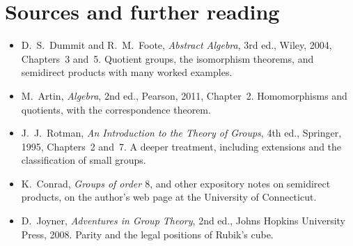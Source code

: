 \section*{Sources and further reading}

\begin{itemize}
\item D.~S.~Dummit and R.~M.~Foote, \emph{Abstract Algebra}, 3rd ed., Wiley, 2004, Chapters~3 and~5. Quotient groups, the isomorphism theorems, and semidirect products with many worked examples.
\item M.~Artin, \emph{Algebra}, 2nd ed., Pearson, 2011, Chapter~2. Homomorphisms and quotients, with the correspondence theorem.
\item J.~J.~Rotman, \emph{An Introduction to the Theory of Groups}, 4th ed., Springer, 1995, Chapters~2 and~7. A deeper treatment, including extensions and the classification of small groups.
\item K.~Conrad, \emph{Groups of order $8$}, and other expository notes on semidirect products, on the author's web page at the University of Connecticut.
\item D.~Joyner, \emph{Adventures in Group Theory}, 2nd ed., Johns Hopkins University Press, 2008. Parity and the legal positions of Rubik's cube.
\end{itemize}
